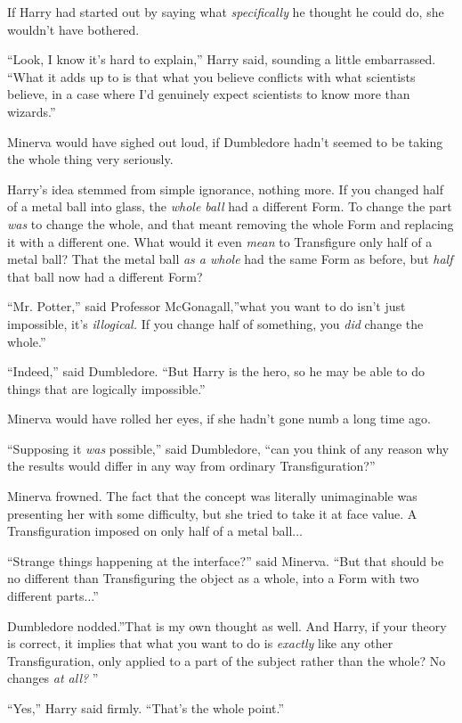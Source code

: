If Harry had started out by saying what \emph{specifically} he thought
he could do, she wouldn't have bothered.

``Look, I know it's hard to explain,'' Harry said, sounding a little
embarrassed. ``What it adds up to is that what you believe conflicts
with what scientists believe, in a case where I'd genuinely expect
scientists to know more than wizards.''

Minerva would have sighed out loud, if Dumbledore hadn't seemed to be
taking the whole thing very seriously.

Harry's idea stemmed from simple ignorance, nothing more. If you changed
half of a metal ball into glass, the \emph{whole ball} had a different
Form. To change the part \emph{was} to change the whole, and that meant
removing the whole Form and replacing it with a different one. What
would it even \emph{mean} to Transfigure only half of a metal ball? That
the metal ball \emph{as a whole} had the same Form as before, but
\emph{half} that ball now had a different Form?

``Mr. Potter,'' said Professor McGonagall,''what you want to do isn't
just impossible, it's \emph{illogical.} If you change half of something,
you \emph{did} change the whole.''

``Indeed,'' said Dumbledore. ``But Harry is the hero, so he may be able
to do things that are logically impossible.''

Minerva would have rolled her eyes, if she hadn't gone numb a long time
ago.

``Supposing it \emph{was} possible,'' said Dumbledore, ``can you think of
any reason why the results would differ in any way from ordinary
Transfiguration?''

Minerva frowned. The fact that the concept was literally unimaginable
was presenting her with some difficulty, but she tried to take it at
face value. A Transfiguration imposed on only half of a metal
ball...

``Strange things happening at the interface?'' said Minerva. ``But that
should be no different than Transfiguring the object as a whole, into a
Form with two different parts...''

Dumbledore nodded.''That is my own thought as well. And Harry, if your
theory is correct, it implies that what you want to do is \emph{exactly}
like any other Transfiguration, only applied to a part of the subject
rather than the whole? No changes \emph{at all?} ''

``Yes,'' Harry said firmly. ``That's the whole point.''

